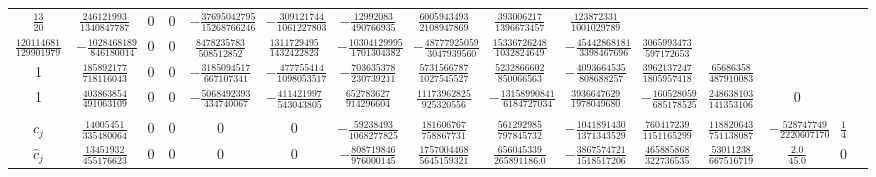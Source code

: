 \begin{landscape}
\begin{table*}
\begin{tabular}{c|cccccccccccccc}
   $\frac{13}{20}$ &     $\frac{246121993}{1340847787}$ &  0 &  0 &  $-\frac{37695042795}{15268766246}$ &
    $-\frac{309121744}{1061227803}$ & $-\frac{12992083}{490766935}$ & $\frac{6005943493}{2108947869}$ &
    $\frac{393006217}{1396673457}$ & $\frac{123872331}{1001029789}$ & \vspace{.1in} \\
    $\frac{1201146811}{1299019798}$ &     $-\frac{1028468189}{ 846180014}$ &  0 &  0 & $\frac{8478235783}{508512852}$ &
    $\frac{1311729495}{1432422823}$ &  $-\frac{10304129995}{1701304382}$ &
    $-\frac{48777925059}{3047939560}$ & $\frac{15336726248}{1032824649}$ &
    $-\frac{45442868181}{3398467696}$ & $\frac{3065993473}{597172653}$ & \vspace{.1in} \\
    1 &     $\frac{185892177}{ 718116043}$ & 0 & 0 & $-\frac{3185094517}{667107341}$ &
    $-\frac{477755414}{1098053517}$ & $-\frac{703635378}{230739211}$ &
    $\frac{5731566787}{1027545527}$ & $\frac{5232866602}{850066563}$ &
    $-\frac{4093664535}{808688257}$ & $\frac{3962137247}{1805957418}$ &
    $\frac{65686358}{487910083}$ & \vspace{.1in} \\
    1 &     $\frac{403863854}{491063109}$ & 0 & 0 & $-\frac{5068492393}{434740067}$ &
    $-\frac{411421997}{543043805}$ & $\frac{652783627}{914296604}$ &
    $\frac{11173962825}{925320556}$ & $-\frac{13158990841}{6184727034}$ &
    $\frac{3936647629}{1978049680}$ & $-\frac{160528059}{685178525}$ &
    $\frac{248638103}{1413531060}$ & 0 & \vspace{.1in}\\ \hline  \\
   $c_j$ & $\frac{14005451 }{ 335480064}$ &  0 &  0 &  0 & 0 &
   $-\frac{59238493}{1068277825}$ & $\frac{ 181606767 }{758867731}$ &
   $\frac{561292985 }{ 797845732}$ & $-\frac{1041891430}{ 1371343529}$ &
   $\frac{760417239}{ 1151165299}$ & $\frac{118820643}{ 751138087}$ &
   $-\frac{528747749}{ 2220607170}$ & $\frac{1}{4}$  \vspace{.1in} \\
   $\hat{c}_j$ & $\frac{ 13451932 }{ 455176623 }$ & 0 & 0 & 0 & 0 & $-\frac{808719846}{976000145}$ &
   $\frac{1757004468}{5645159321}$ & $\frac{656045339}{265891186.0}$ & $-\frac{3867574721}{1518517206}$
   & $\frac{465885868}{322736535}$ & $\frac{53011238}{ 667516719}$
   &  $\frac{ 2.0 }{ 45.0}$ &  0 \\
  \hline\hline
\end{tabular}
\label{Table:PD78Coefficients}
\end{table*}
\end{landscape}
